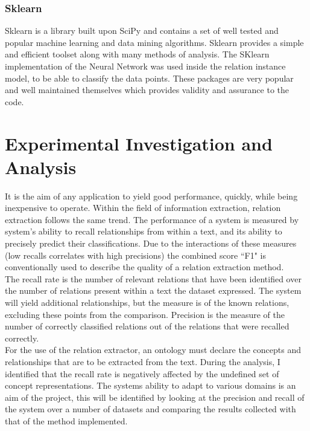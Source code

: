 \documentclass[12pt]{article} %
\begin{document}
\subsubsection{Sklearn}
Sklearn is a library built upon SciPy and contains a set of well tested and popular machine learning and data mining algorithms. Sklearn provides a simple and efficient toolset along with many methods of analysis. The SKlearn implementation of the Neural Network was used inside the relation instance model, to be able to classify the data points. These packages are very popular and well maintained themselves which provides validity and assurance to the code.

\section{Experimental Investigation and Analysis}

It is the aim of any application to yield good performance, quickly, while being inexpensive to operate. Within the field of information extraction, relation extraction follows the same trend. The performance of a system is measured by system's ability to recall relationships from within a text, and its ability to precisely predict their classifications. Due to the interactions of these measures (low recalls correlates with high precisions) the combined score ``F1" is conventionally used to describe the quality of a relation extraction method.\\

The recall rate is the number of relevant relations that have been identified over the number of relations present within a text the dataset expressed. The system will yield additional relationships, but the measure is of the known relations, excluding these points from the comparison. Precision is the measure of the number of correctly classified relations out of the relations that were recalled correctly.\\

For the use of the relation extractor, an ontology must declare the concepts and relationships that are to be extracted from the text. During the analysis, I identified that the recall rate is negatively affected by the undefined set of concept representations. The systems ability to adapt to various domains is an aim of the project, this will be identified by looking at the precision and recall of the system over a number of datasets and comparing the results collected with that of the method implemented.
\end{document}
